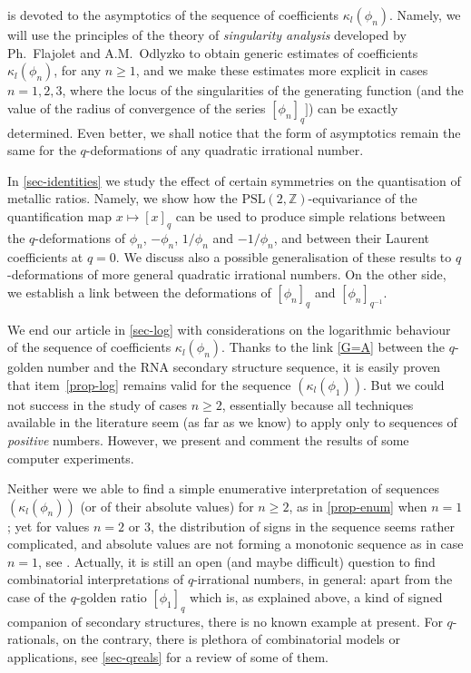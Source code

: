 \documentclass[11pt,reqno]{amsart}
\theoremstyle{plain}
\theoremstyle{definition}
\numberwithin{figure}{section}
\numberwithin{table}{section}
\numberwithin{equation}{section}
\newcommand{\Z}{\mathbb{Z}}
\newcommand{\PSL}{\mathrm{PSL}}
\newcommand\ka{\kappa}
\begin{document}
 is devoted to the asymptotics of the sequence of coefficients $\ka_l(\phi_n)$. Namely, we will use the principles of the theory of \emph{singularity analysis} developed by Ph.~Flajolet and A.M.~Odlyzko to obtain generic estimates of coefficients $\ka_l(\phi_n)$, for any $n≥1$, and we make these estimates more explicit in cases $n=1,2,3$, where the  locus of the singularities of the generating function (and the value of the radius of convergence of the series $[\phi_n]_q]$) can be exactly determined. Even better, we shall notice that the form of asymptotics remain the same for the $q$-deformations of any quadratic irrational number.

In \cref{sec-identities} we study the effect of certain symmetries on the quantisation of metallic ratios. Namely, we show how the $\PSL(2,\Z)$-equivariance of the quantification map $x\mapsto [x]_q$ can be used to produce simple relations between the $q$-deformations of $\phi_n$, $-\phi_n$, $1/\phi_n$ and $-1/\phi_n$, and between their Laurent coefficients at $q=0$. We discuss also a possible generalisation of these results to $q$-deformations of more general quadratic irrational numbers. On the other side, we establish a link between the deformations of $[\phi_n]_q$ and $[\phi_n]_{q^{-1}}$.

We end our article in \cref{sec-log} with  considerations on the logarithmic behaviour of the sequence of coefficients $\ka_l(\phi_n)$. Thanks to the link \eqref{G=A} between the $q$-golden number and the RNA secondary structure sequence, it is easily proven that item~\ref{prop-log} remains valid for the sequence $(\ka_l(\phi_1))$. But we could not success in the study of cases $n≥2$, essentially because all techniques available in the literature seem (as far as we know) to apply only  to sequences of \emph{positive} numbers. However, we present and comment the results of some computer experiments.

Neither were we able  to find a simple enumerative interpretation of  sequences $(\ka_l(\phi_n))$ (or of their absolute values) for $n≥2$, as in \ref{prop-enum} when $n=1$; yet for  values $n=2$ or $3$, the distribution of signs in the sequence seems rather complicated, and absolute values are not forming a monotonic sequence as in case $n=1$, see . Actually, it is still an open (and maybe difficult) question to find combinatorial interpretations of $q$-irrational numbers, in general: apart from the case of the $q$-golden ratio $[\phi_1]_q$ which is, as explained above, a kind of signed companion of secondary structures, there is no known example at present. For $q$-rationals, on the contrary, there is plethora of combinatorial models or applications, see \cref{sec-qreals} for a review of some of them.
\end{document}
